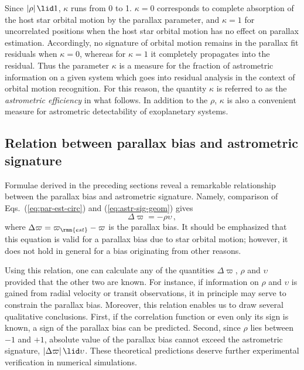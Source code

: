\documentclass[fleqn,usenatbib,useAMS,usedcolumn]{mnras}
\begin{document}
Since $\left|\rho\right|\lid 1$, $\kappa$ runs from 0 to 1. $\kappa=0$ corresponds to complete absorption of the host star orbital motion by the parallax parameter, and $\kappa=1$ for uncorrelated positions when the host star orbital motion has no effect on parallax estimation. Accordingly, no signature of orbital motion remains in the parallax fit residuals when $\kappa=0$, whereas for $\kappa=1$ it completely propagates into the residual. Thus the parameter $\kappa$ is a measure for the fraction of astrometric information on a given system which goes into residual analysis in the context of orbital motion recognition. For this reason, the quantity $\kappa$ is referred to as the \emph{astrometric efficiency} in what follows. In addition to the $\rho$, $\kappa$ is also a convenient measure for astrometric detectability of exoplanetary systems.

\subsection{Relation between parallax bias and astrometric signature}

Formulae derived in the preceding sections reveal a remarkable relationship between the parallax bias and astrometric signature. Namely, comparison of Eqs.~(\ref{eq:par-est-circ}) and (\ref{eq:astr-sig-geom}) gives
\begin{equation}\label{eq:parBias-astrSignature}
  \Delta\varpi=-\rho\upsilon\,,
\end{equation}
where $\Delta\varpi=\varpi_\rmn{est}-\varpi$ is the parallax bias. It should be emphasized that this equation is valid for a parallax bias due to star orbital motion; however, it does not hold in general for a bias originating from other reasons.

Using this relation, one can calculate any of the quantities $\Delta\varpi$, $\rho$ and $\upsilon$ provided that the other two are known. For instance, if information on $\rho$ and $\upsilon$ is gained from radial velocity or transit observations, it in principle may serve to constrain the parallax bias. Moreover, this relation enables us to draw several qualitative conclusions. First, if the correlation function or even only its sign is known, a sign of the parallax bias can be predicted. Second, since $\rho$ lies between $-1$ and $+1$, absolute value of the parallax bias cannot exceed the astrometric signature, $\left|\Delta\varpi\right|\lid\upsilon$. These theoretical predictions deserve further experimental verification in numerical simulations.
\end{document}
